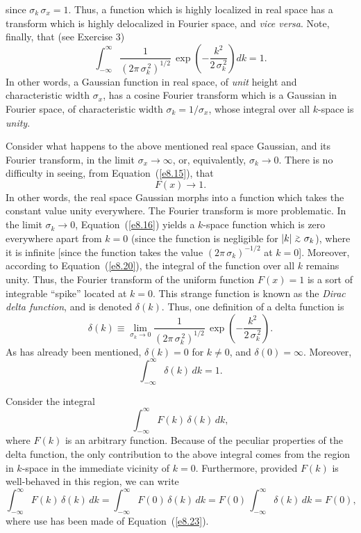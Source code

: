 since $\sigma_k\,\sigma_x=1$. 
Thus, a function which is highly localized in real space has a transform which is
highly delocalized in Fourier space, and {\em vice versa}. Note, finally, that (see Exercise 3)
\begin{equation}\label{e8.20}
\int_{-\infty}^\infty \frac{1}{(2\pi\,\sigma_k^{\,2})^{1/2}}\,\exp\left(-\frac{k^2}{2\,\sigma_k^{\,2}}\right) dk = 1.
\end{equation}
In other words, a Gaussian function in real space, of {\em unit}\/ height and characteristic width $\sigma_x$, has a cosine Fourier transform
which is a Gaussian in Fourier space, of characteristic width $\sigma_k=1/\sigma_x$, whose integral over all
$k$-space is {\em unity}.

Consider what happens to the above mentioned real space Gaussian, and its Fourier transform, in the limit $\sigma_x\rightarrow \infty$, or, equivalently, $\sigma_k\rightarrow 0$. There is no difficulty in seeing, from Equation~(\ref{e8.15}), that
\begin{equation}
F(x)\rightarrow 1.
\end{equation}
In other words, the real space Gaussian morphs into a function which takes the
constant value unity everywhere. The Fourier transform is more problematic. In the
limit $\sigma_k\rightarrow 0$, Equation~(\ref{e8.16}) yields a $k$-space function which
is zero everywhere apart from $k=0$ (since the function is negligible for $|k|\stackrel {_{\normalsize>}}{_{\normalsize \sim}} \sigma_k$), where it is infinite [since the function takes the value $(2\pi\,\sigma_k)^{-1/2}$ at $k=0$]. Moreover, according to
Equation~(\ref{e8.20}), the integral of the function over all $k$ remains unity. Thus, the
Fourier transform of the uniform function $F(x)=1$ is a sort of integrable ``spike''
located at $k=0$. This strange function is known as the {\em Dirac delta function}, and
is denoted $\delta (k)$. Thus, one definition of a delta function is
\begin{equation}
\delta (k)\equiv \lim_{\sigma_k\rightarrow 0}\frac{1}{(2\pi\,\sigma_k^{\,2})^{1/2}}\,\exp\left(-\frac{k^2}{2\,\sigma_k^{\,2}}\right).
\end{equation}
As has already been mentioned, $\delta(k)=0$ for $k\neq 0$, and $\delta(0)=\infty$.
Moreover,
\begin{equation}\label{e8.23}
\int_{-\infty}^\infty\delta (k)\,dk = 1.
\end{equation}

Consider the integral
\begin{equation}
\int_{-\infty}^\infty F(k)\,\delta(k)\,dk,
\end{equation}
where $F(k)$ is an arbitrary function. 
Because of the peculiar properties of the delta function, the only contribution
to the above integral comes from the region in $k$-space in the immediate vicinity of $k=0$. Furthermore, provided $F(k)$
is well-behaved in this region, we can write
\begin{equation}
\int_{-\infty}^{\infty} F(k)\,\delta(k)\,dk = \int_{-\infty}^\infty F(0)\,\delta (k)\,dk=F(0)\,\int_{-\infty}^{\infty} \delta(k)\,dk = F(0),
\end{equation}
where use has been made of Equation~(\ref{e8.23}). 

